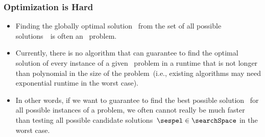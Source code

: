 \documentclass[aspectratio=169,mathserif,notheorems]{beamer}%
\begin{document}
%
\begin{frame}[t]%
\frametitle{Optimization is Hard}%
\begin{itemize}%
%
\item Finding the globally optimal solution~\globalOptimumOf{\sespel} from the set of all possible solutions~\searchSpace\ is often an \npHard\ problem.%
%
\item<2-> Currently, there is no algorithm that can \alert{guarantee} to find the optimal solution of \alert{every instance} of a given \npHard\ problem in a runtime that is not longer than polynomial in the size of the problem~(i.e., existing algorithms may need exponential runtime in the \alert{worst case}).%
%
\item<4-> In other words, if we want to guarantee to find the best possible solution~\globalOptimumOf{\sespel} for all possible instances of a problem, we often cannot really be much faster than testing all possible candidate solutions~$\sespel\in\searchSpace$ in the \alert{worst case}.%
%
\end{itemize}%
%
%
%
\end{frame}%
%
\end{document}
